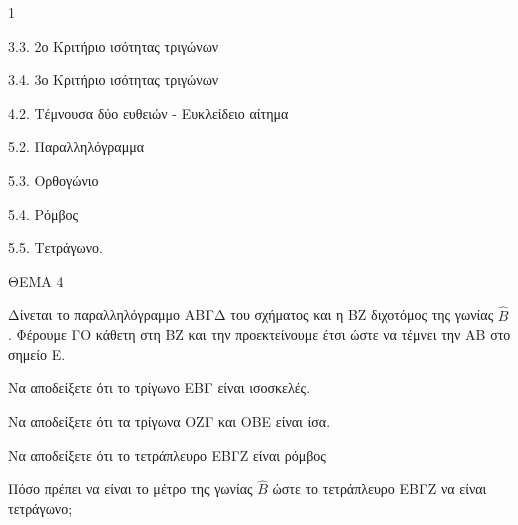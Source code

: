 \begin{ylh}{1}
    \item 3.3. 2ο Κριτήριο ισότητας τριγώνων
    \item 3.4. 3ο Κριτήριο ισότητας τριγώνων
    \item 4.2. Τέμνουσα δύο ευθειών - Ευκλείδειο αίτημα
    \item 5.2. Παραλληλόγραμμα
    \item 5.3. Ορθογώνιο
    \item 5.4. Ρόμβος
    \item 5.5. Τετράγωνο.
\end{ylh}

ΘΕΜΑ 4

Δίνεται το παραλληλόγραμμο ΑΒΓΔ του σχήματος και η ΒΖ διχοτόμος της γωνίας $\widehat{Β}$. Φέρουμε ΓΟ κάθετη στη ΒΖ και την προεκτείνουμε έτσι ώστε να τέμνει την ΑΒ στο σημείο Ε.

\begin{alist}
\item Να αποδείξετε ότι το τρίγωνο ΕΒΓ είναι ισοσκελές. 

\item Να αποδείξετε ότι τα τρίγωνα ΟΖΓ και ΟΒΕ είναι ίσα. 

\item Να αποδείξετε ότι το τετράπλευρο ΕΒΓΖ είναι ρόμβος 

\item Πόσο πρέπει να είναι το μέτρο της γωνίας $\widehat{Β}$ ώστε το τετράπλευρο ΕΒΓΖ να είναι τετράγωνο; 


\begin{center}
\end{center}
\end{alist}
